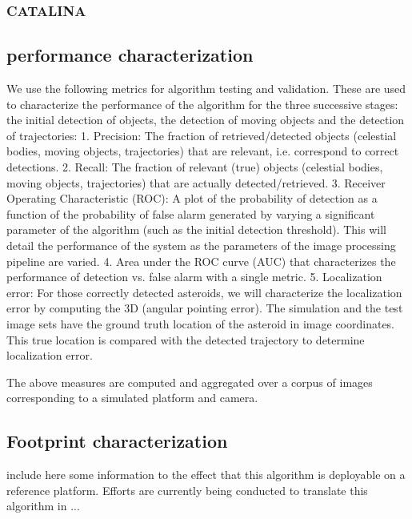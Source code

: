 \subsubsection{CATALINA}


\subsection{performance characterization}
We use the following metrics for algorithm testing and validation.  These are used to characterize the performance of the algorithm for the three successive stages: the initial detection of objects, the detection of moving objects and the detection of trajectories:
1.	Precision: The fraction of retrieved/detected objects (celestial bodies, moving objects, trajectories) that are relevant, i.e. correspond to correct detections.
2.	Recall: The fraction of relevant (true) objects (celestial bodies, moving objects, trajectories) that are actually detected/retrieved.
3.	Receiver Operating Characteristic (ROC): A plot of the probability of detection as a function of the probability of false alarm generated by varying a significant parameter of the algorithm (such as the initial detection threshold).  This will detail the performance of the system as the parameters of the image processing pipeline are varied. 
4.	Area under the ROC curve (AUC) that characterizes the performance of detection vs. false alarm with a single metric.
5.	Localization error: For those correctly detected asteroids, we will characterize the localization error by computing the 3D (angular pointing error).  The simulation and the test image sets have the ground truth location of the asteroid in image coordinates.  This true location is compared with the detected trajectory to determine localization error.

The above measures are computed and aggregated over a corpus of images corresponding to a simulated platform and camera.
\subsection{Footprint characterization}
include here some information to the effect that this algorithm is deployable on a reference platform.
Efforts are currently being conducted to translate this algorithm in ...